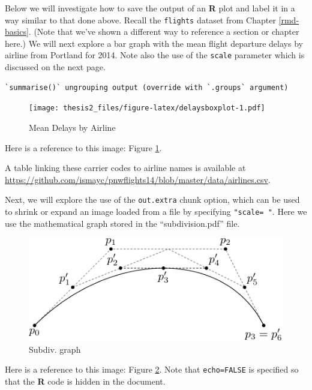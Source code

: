 \documentclass[twoside,12pt,final]{ucthesis-CA2012}
\newenvironment{Shaded}{}{}
\newcommand{\KeywordTok}[1]{\textcolor[rgb]{0.00,0.44,0.13}{\textbf{{#1}}}}
\newcommand{\DataTypeTok}[1]{\textcolor[rgb]{0.56,0.13,0.00}{{#1}}}
\newcommand{\StringTok}[1]{\textcolor[rgb]{0.25,0.44,0.63}{{#1}}}
\newcommand{\NormalTok}[1]{{#1}}
\newcommand{\OperatorTok}[1]{\textcolor[rgb]{0.00,0.44,0.13}{\textbf{{#1}}}}
\begin{document}
\begin{ucmainmatter}
\clearpage

Below we will investigate how to save the output of an \textbf{R} plot and label it in a way similar to that done above. Recall the \texttt{flights} dataset from Chapter \ref{rmd-basics}. (Note that we've shown a different way to reference a section or chapter here.) We will next explore a bar graph with the mean flight departure delays by airline from Portland for 2014. Note also the use of the \texttt{scale} parameter which is discussed on the next page.
\begin{Shaded}
\end{Shaded}
\begin{verbatim}
`summarise()` ungrouping output (override with `.groups` argument)
\end{verbatim}
\begin{figure}
\centering
\texttt{[image: thesis2\_files/figure-latex/delaysboxplot-1.pdf]}
\caption{\label{fig:delaysboxplot}Mean Delays by Airline}
\end{figure}
Here is a reference to this image: Figure \ref{fig:delaysboxplot}.

A table linking these carrier codes to airline names is available at \url{https://github.com/ismayc/pnwflights14/blob/master/data/airlines.csv}.

\clearpage

Next, we will explore the use of the \texttt{out.extra} chunk option, which can be used to shrink or expand an image loaded from a file by specifying \texttt{"scale=\ "}. Here we use the mathematical graph stored in the ``subdivision.pdf'' file.
\begin{figure}
\includegraphics[scale=0.75]{figure/subdivision} \caption{Subdiv. graph}\label{fig:subd}
\end{figure}
Here is a reference to this image: Figure \ref{fig:subd}. Note that \texttt{echo=FALSE} is specified so that the \textbf{R} code is hidden in the document.


\end{ucmainmatter}
\end{document}
